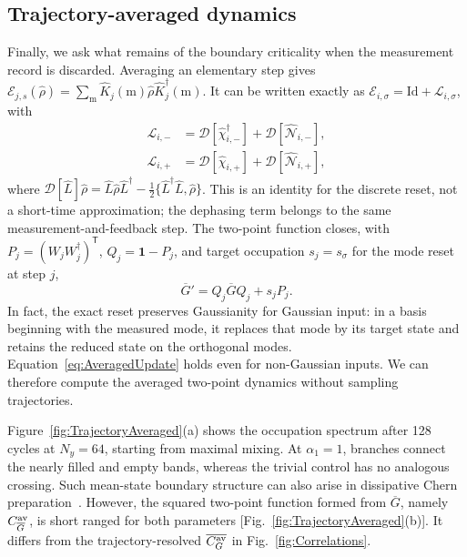 \documentclass[aps,prb,10pt,twocolumn,superscriptaddress,longbibliography,floatfix]{revtex4-2}
\newcommand{\mc}[1]{\mathcal{#1}}
\newcommand{\Id}{\mathbf{1}}
\begin{document}
{\color{blue}
\subsection{Trajectory-averaged dynamics}
\label{sec:TrajectoryAveraged}

Finally, we ask what remains of the boundary criticality when the measurement record is discarded. Averaging an elementary step gives $\mc E_{j,s}(\hat\rho)=\sum_{\mathrm m}\hat K_j(\mathrm m)\hat\rho\hat K_j^\dagger(\mathrm m)$. It can be written exactly as $\mc E_{i,\sigma}=\mathrm{Id}+\mc L_{i,\sigma}$, with
\begin{align}
 \mc L_{i,-}&=\mc D[\hat\chi_{i,-}^\dagger]+\mc D[\hat{\mc N}_{i,-}],\nonumber\\
 \mc L_{i,+}&=\mc D[\hat\chi_{i,+}]+\mc D[\hat{\mc N}_{i,+}],
 \label{eq:AveragedChannel}
\end{align}
where $\mc D[\hat L]\hat\rho=\hat L\hat\rho\hat L^\dagger-\tfrac12\{\hat L^\dagger\hat L,\hat\rho\}$. This is an identity for the discrete reset, not a short-time approximation; the dephasing term belongs to the same measurement-and-feedback step. The two-point function closes, with $P_j=(W_jW_j^\dagger)^{\mathsf T}$, $Q_j=\Id-P_j$, and target occupation $s_j=s_\sigma$ for the mode reset at step $j$,
\begin{equation}
 \overline G'=Q_j\overline GQ_j+s_jP_j.
 \label{eq:AveragedUpdate}
\end{equation}
In fact, the exact reset preserves Gaussianity for Gaussian input: in a basis beginning with the measured mode, it replaces that mode by its target state and retains the reduced state on the orthogonal modes. Equation~\eqref{eq:AveragedUpdate} holds even for non-Gaussian inputs. We can therefore compute the averaged two-point dynamics without sampling trajectories.

Figure~\ref{fig:TrajectoryAveraged}(a) shows the occupation spectrum after 128 cycles at $N_y=64$, starting from maximal mixing. At $\alpha_1=1$, branches connect the nearly filled and empty bands, whereas the trivial control has no analogous crossing. Such mean-state boundary structure can also arise in dissipative Chern preparation~\cite{Goldstein2019}. However, the squared two-point function formed from $\overline G$, namely $C_{\overline G}^{\rm av}$, is short ranged for both parameters [Fig.~\ref{fig:TrajectoryAveraged}(b)]. It differs from the trajectory-resolved $\overline{C_G^{\rm av}}$ in Fig.~\ref{fig:Correlations}.

}
\end{document}
